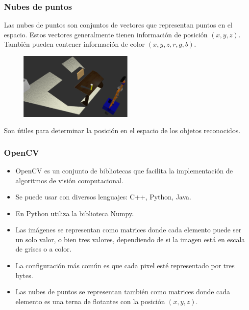\begin{frame}\frametitle{Nubes de puntos}
  Las nubes de puntos son conjuntos de vectores que representan puntos en el espacio. Estos vectores generalmente tienen información de posición $(x,y,z)$. También pueden contener información de color $(x,y,z,r,g,b)$.
  \begin{figure}
      \centering
      \includegraphics[width=0.5\textwidth]{Figures/CloudExample.png}
  \end{figure}
  Son útiles para determinar la posición en el espacio de los objetos reconocidos. 
\end{frame}

\begin{frame}\frametitle{OpenCV}
  \begin{itemize}
  \item OpenCV es un conjunto de bibliotecas que facilita la implementación de algoritmos de visión computacional.
  \item Se puede usar con diversos lenguajes: C++, Python, Java.
  \item En Python utiliza la biblioteca Numpy.
  \item Las imágenes se representan como matrices donde cada elemento puede ser un solo valor, o bien tres valores, dependiendo de si la imagen está en escala de grises o a color.
  \item La configuración más común es que cada pixel esté representado por tres bytes.
  \item Las nubes de puntos se representan también como matrices donde cada elemento es una terna de flotantes con la posición $(x,y,z)$.
  \end{itemize}
\end{frame}

